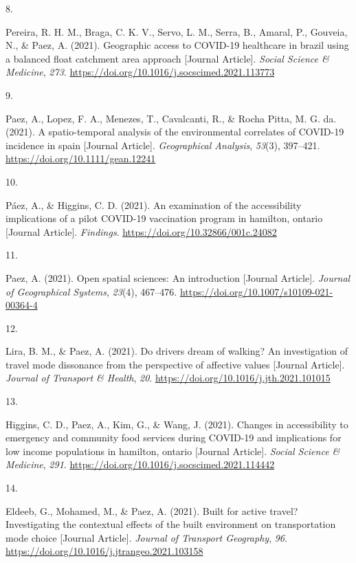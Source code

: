 \documentclass[10pt,a4paper,]{twentysecondcv}
\newlength{\csllabelwidth}
\newcommand{\CSLLeftMargin}[1]{\parbox[t]{\csllabelwidth}{#1}}
\newcommand{\CSLRightInline}[1]{\parbox[t]{\linewidth - \csllabelwidth}{#1}}
\begin{document}
\leavevmode{}%
\CSLLeftMargin{8. }%
\CSLRightInline{Pereira, R. H. M., Braga, C. K. V., Servo, L. M., Serra,
B., Amaral, P., Gouveia, N., \& Paez, A. (2021). Geographic access to
COVID-19 healthcare in brazil using a balanced float catchment area
approach {[}Journal Article{]}. \emph{Social Science \& Medicine},
\emph{273}. \url{https://doi.org/10.1016/j.socscimed.2021.113773}}

\leavevmode{}%
\CSLLeftMargin{9. }%
\CSLRightInline{Paez, A., Lopez, F. A., Menezes, T., Cavalcanti, R., \&
Rocha Pitta, M. G. da. (2021). A spatio-temporal analysis of the
environmental correlates of COVID-19 incidence in spain {[}Journal
Article{]}. \emph{Geographical Analysis}, \emph{53}(3), 397--421.
\url{https://doi.org/10.1111/gean.12241}}

\leavevmode{}%
\CSLLeftMargin{10. }%
\CSLRightInline{Páez, A., \& Higgins, C. D. (2021). An examination of
the accessibility implications of a pilot COVID-19 vaccination program
in hamilton, ontario {[}Journal Article{]}. \emph{Findings}.
\url{https://doi.org/10.32866/001c.24082}}

\leavevmode{}%
\CSLLeftMargin{11. }%
\CSLRightInline{Paez, A. (2021). Open spatial sciences: An introduction
{[}Journal Article{]}. \emph{Journal of Geographical Systems},
\emph{23}(4), 467--476.
\url{https://doi.org/10.1007/s10109-021-00364-4}}

\leavevmode{}%
\CSLLeftMargin{12. }%
\CSLRightInline{Lira, B. M., \& Paez, A. (2021). Do drivers dream of
walking? An investigation of travel mode dissonance from the perspective
of affective values {[}Journal Article{]}. \emph{Journal of Transport \&
Health}, \emph{20}. \url{https://doi.org/10.1016/j.jth.2021.101015}}

\leavevmode{}%
\CSLLeftMargin{13. }%
\CSLRightInline{Higgins, C. D., Paez, A., Kim, G., \& Wang, J. (2021).
Changes in accessibility to emergency and community food services during
COVID-19 and implications for low income populations in hamilton,
ontario {[}Journal Article{]}. \emph{Social Science \& Medicine},
\emph{291}. \url{https://doi.org/10.1016/j.socscimed.2021.114442}}

\leavevmode{}%
\CSLLeftMargin{14. }%
\CSLRightInline{Eldeeb, G., Mohamed, M., \& Paez, A. (2021). Built for
active travel? Investigating the contextual effects of the built
environment on transportation mode choice {[}Journal Article{]}.
\emph{Journal of Transport Geography}, \emph{96}.
\url{https://doi.org/10.1016/j.jtrangeo.2021.103158}}
\end{document}

